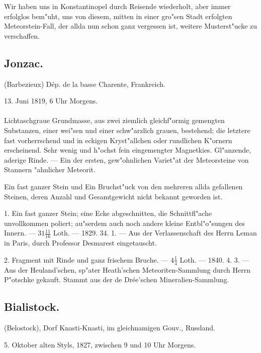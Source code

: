 \documentclass[a4paper, 11pt, oneside, polutonikogreek, german]{article}
\begin{document}
Wir haben uns in Konstantinopel durch Reisende wiederholt, aber immer erfolglos bem"uht, uns von diesem, mitten in einer gro"sen Stadt erfolgten Meteorstein-Fall, der allda nun schon ganz vergessen ist, weitere Musterst"ucke zu verschaffen.
\subsection{Jonzac.}
\begin{center}
\small
(Barbezieux) Dép. de la basse Charente, Frankreich.

13. Juni 1819, 6 Uhr Morgens.
\end{center}
\paragraph{}
Lichtaschgraue Grundmasse, aus zwei ziemlich gleichf"ormig gemengten Substanzen, einer wei"sen und einer schw"arzlich grauen, bestehend; die letztere fast vorherrschend und in eckigen Kryst"allchen oder rundlichen K"ornern erscheinend. Sehr wenig und h"ochst fein eingemengter Magnetkies. Gl"anzende, aderige Rinde. --- Ein der ersten, gew"ohnlichen Variet"at der Meteorsteine von Stannern "ahnlicher Meteorit.

Ein fast ganzer Stein und Ein Bruchst"uck von den mehreren allda gefallenen Steinen, deren Anzahl und Gesamtgewicht nicht bekannt geworden ist.

1. Ein fast ganzer Stein; eine Ecke abgeschnitten, die Schnittfl"ache unvollkommen poliert; au"serdem auch noch andere kleine Entbl"o"sungen des Innern. --- $31\frac{11}{16}$ Loth. --- 1829. 34. 1. --- Aus der Verlassenschaft des Herrn Leman in Paris, durch Professor Desmarest eingetauscht.

2. Fragment mit Rinde und ganz frischem Bruche. --- $4\frac{1}{4}$ Loth. --- 1840. 4. 3. --- Aus der Heuland'schen, sp"ater Heath'schen Meteoriten-Sammlung durch Herrn P"otschke gekauft. Stammt aus der de Drée'schen Mineralien-Sammlung.
\subsection{Bialistock.}
\begin{center}
\small
(Belostock), Dorf Knasti-Knasti, im gleichnamigen Gouv., Russland.

5. Oktober alten Styls, 1827, zwischen 9 und 10 Uhr Morgens.
\end{center}
\end{document}
